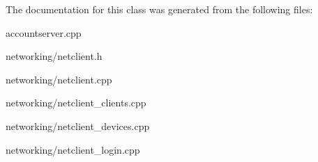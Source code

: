 The documentation for this class was generated from the following files\+:\begin{DoxyCompactItemize}
\item 
accountserver.\+cpp\item 
networking/netclient.\+h\item 
networking/netclient.\+cpp\item 
networking/netclient\+\_\+clients.\+cpp\item 
networking/netclient\+\_\+devices.\+cpp\item 
networking/netclient\+\_\+login.\+cpp\end{DoxyCompactItemize}
